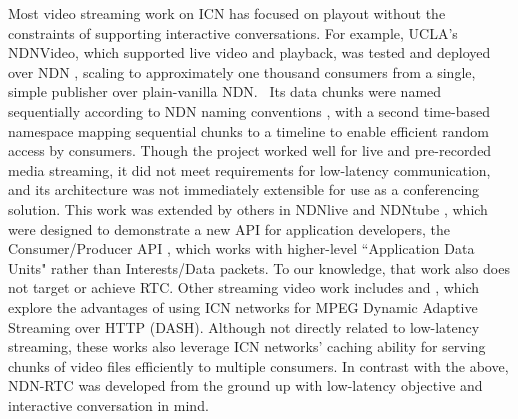 \documentclass{icn/sig-alternate-2013} %
\newcommand{\ndnrtcName}{NDN-RTC} %
\begin{document}
Most video streaming work on ICN has focused on playout without the constraints of supporting interactive conversations.  For example, UCLA's NDNVideo, which supported live video and playback, was tested and deployed over NDN \cite{ndnvideo}, scaling to approximately one thousand consumers from a single, simple publisher over plain-vanilla NDN.~\cite{CrowleyNEAPresentation} Its data chunks were named sequentially according to NDN naming conventions \cite{ndnnaming}, with a second time-based namespace mapping sequential chunks to a timeline to enable efficient random access by consumers. Though the project worked well for live and pre-recorded media streaming, it did not meet requirements for low-latency communication, and its architecture was not immediately extensible for use as a conferencing solution. This work was extended by others in NDNlive and NDNtube \cite{ndnlive-tube}, which were designed to demonstrate  a new API for application developers, the Consumer/Producer API \cite{cons-prod-api}, which works with higher-level ``Application Data Units" rather than Interests/Data packets.  To our knowledge, that work also does not target or achieve RTC. %
Other streaming video work includes \cite{ccn-dash} and \cite{ndn-dash}, which explore the advantages of using ICN networks for MPEG Dynamic Adaptive Streaming over HTTP (DASH). Although not directly related to low-latency streaming, these works also leverage ICN networks' caching ability for serving chunks of video files efficiently to multiple consumers.
In contrast with the above, \ndnrtcName{} was developed from the ground up with low-latency objective and interactive conversation in mind. %
\end{document}
